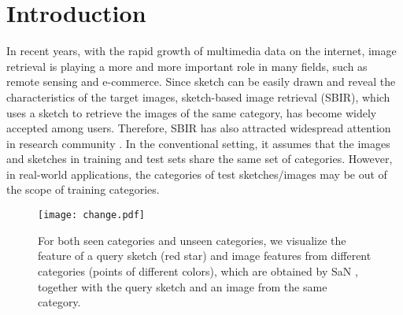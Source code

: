 \documentclass[10pt,twocolumn,letterpaper]{article}
\begin{document}
\section{Introduction}
In recent years, with the rapid growth of multimedia data on the internet, image retrieval is playing a more and more important role in many fields, such as remote sensing and e-commerce. 
Since sketch can be easily drawn and reveal the characteristics of the target images, sketch-based image retrieval (SBIR), which uses a sketch to retrieve the images of the same category, has become widely accepted among users. 
Therefore, SBIR has also attracted widespread attention in research community \cite{del1997visual, cao2010mindfinder, eitz2010evaluation, eitz2010sketch, cao2011edgel, hu2011bag, zhou2012sketch, hu2013performance, cao2013sym, parui2014similarity, james2014reenact, wang2015sketch, saavedra2015sketch, li2016fine, yu2016sketch, qi2016sketch, sangkloy2016sketchy, lu2018learning, saavedra2014sketch}. 
In the conventional setting, it assumes that the images and sketches in training and test sets share the same set of categories.
However, in real-world applications, the categories of test sketches/images may be out of the scope of training categories.

\begin{figure}
\centering
\texttt{[image: change.pdf]}
   \caption{For both seen categories and unseen categories, we visualize the feature of a query sketch (red star) and image features from different categories (points of different colors), which are obtained by SaN \cite{yu2017sketch}, together with the query sketch and an image from the same category.}
\label{fig:inshort}
\vspace{-15pt}
\end{figure}
\end{document}
